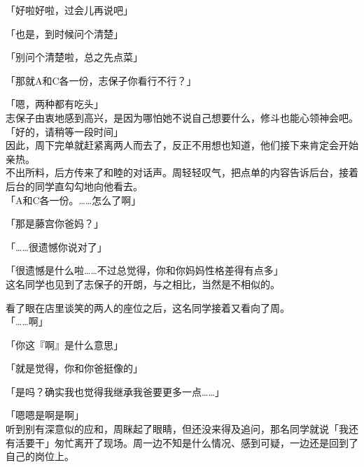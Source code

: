 「好啦好啦，过会儿再说吧」

「也是，到时候问个清楚」

「别问个清楚啦，总之先点菜」

「那就A和C各一份，志保子你看行不行？」

「嗯，两种都有吃头」\\

志保子由衷地感到高兴，是因为哪怕她不说自己想要什么，修斗也能心领神会吧。\\

「好的，请稍等一段时间」\\

因此，周下完单就赶紧离两人而去了，反正不用想也知道，他们接下来肯定会开始亲热。\\

不出所料，后方传来了和睦的对话声。周轻轻叹气，把点单的内容告诉后台，接着后台的同学直勾勾地向他看去。\\

「A和C各一份。……怎么了啊」

「那是藤宫你爸妈？」

「……很遗憾你说对了」

「很遗憾是什么啦……不过总觉得，你和你妈妈性格差得有点多」\\

这名同学也见到了志保子的开朗，与之相比，当然是不相似的。

看了眼在店里谈笑的两人的座位之后，这名同学接着又看向了周。\\

「……啊」

「你这『啊』是什么意思」

「就是觉得，你和你爸挺像的」

「是吗？确实我也觉得我继承我爸要更多一点……」

「嗯嗯是啊是啊」\\

听到别有深意似的应和，周眯起了眼睛，但还没来得及追问，那名同学就说「我还有活要干」匆忙离开了现场。周一边不知是什么情况、感到可疑，一边还是回到了自己的岗位上。
